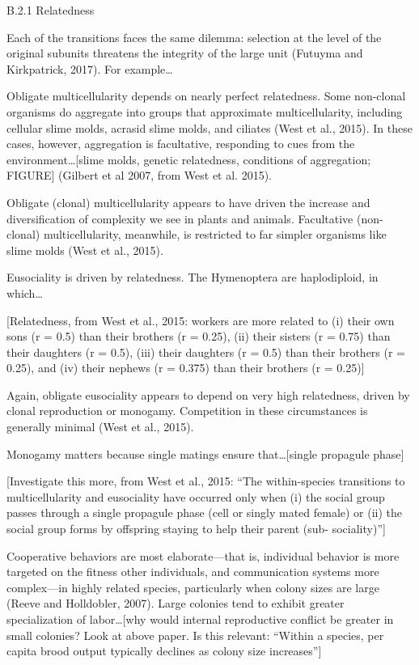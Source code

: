 \documentclass{tufte-book} %
\begin{document}
B.2.1 Relatedness


Each of the transitions faces the same dilemma: selection at the level of the original subunits threatens the integrity of the large unit (Futuyma and Kirkpatrick, 2017). For example…

Obligate multicellularity depends on nearly perfect relatedness. Some non-clonal organisms do aggregate into groups that approximate multicellularity, including cellular slime molds, acrasid slime molds, and ciliates (West et al., 2015). In these cases, however, aggregation is facultative, responding to cues from the environment…[slime molds, genetic relatedness, conditions of aggregation; FIGURE] (Gilbert et al 2007, from West et al. 2015).

Obligate (clonal) multicellularity appears to have driven the increase and diversification of complexity we see in plants and animals. Facultative (non-clonal) multicellularity, meanwhile, is restricted to far simpler organisms like slime molds (West et al., 2015). 

Eusociality is driven by relatedness. The Hymenoptera are haplodiploid, in which…

[Relatedness, from West et al., 2015: workers are more related to (i) their own sons (r = 0.5) than their brothers (r = 0.25), (ii) their sisters (r = 0.75) than their daughters (r = 0.5), (iii) their daughters (r = 0.5) than their brothers (r = 0.25), and (iv) their nephews (r = 0.375) than their brothers (r = 0.25)]

Again, obligate eusociality appears to depend on very high relatedness, driven by clonal reproduction or monogamy. Competition in these circumstances is generally minimal (West et al., 2015).

Monogamy matters because single matings ensure that…[single propagule phase]

[Investigate this more, from West et al., 2015: “The within-species transitions to multicellularity and eusociality have occurred only when (i) the social group passes through a single propagule phase (cell or singly mated female) or (ii) the social group forms by offspring staying to help their parent (sub- sociality)”]

Cooperative behaviors are most elaborate—that is, individual behavior is more targeted on the fitness other individuals, and communication systems more complex—in highly related species, particularly when colony sizes are large (Reeve and Holldobler, 2007). Large colonies tend to exhibit greater specialization of labor…[why would internal reproductive conflict be greater in small colonies? Look at above paper. Is this relevant: “Within a species, per capita brood output typically declines as colony size increases”]
\end{document}
